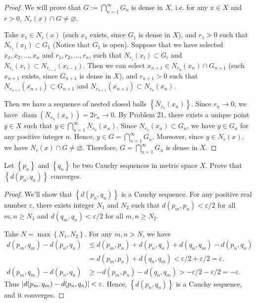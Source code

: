 \documentclass{article}
\begin{document}
\begin{proof}
	We will prove that \( G:=\bigcap_{n=1}^{\infty} G_n \) is dense in \( X \), i.e. for any \( x\in X \) and \( r>0 \), \( N_r(x)\cap G\neq\varnothing \). \par
	Take \( x_1\in N_r(x) \) (such \( x_1 \) exists, since \( G_1 \) is dense in \( X \)), and \( r_1>0 \) such that \( N_{r_1}(x_1)\subset G_1 \) (Notice that \( G_1 \) is open). 
	Suppose that we have selected \( x_1,x_2,\dots,x_{n} \) and \( r_1,r_2,\dots,r_{n} \), such that \( N_{r_i}(x_i)\subset G_i \) and \( N_{r_i}(x_i)\subset N_{r_{i-1}}(x_{i-1}) \). Then we can select \( x_{n+1}\in N_{r_n}(x_n)\cap G_{n+1} \) (such \( x_{n+1} \) exists, since \( G_{n+1} \) is dense in \( X \)), and \( r_{n+1}>0 \) such that \( N_{r_{n+1}}(x_{n+1})\subset G_{n+1} \) and \( N_{r_{n+1}}(x_{n+1})\subset N_{r_n}(x_n) \). \par
	Then we have a sequence of nested closed balls \( \left\{\overline{N}_{r_n}(x_n)\right\} \). Since \( r_n\to 0 \), we have \( \operatorname{diam}(\overline{N}_{r_n}(x_n))=2r_n\to 0 \). By Problem 21, there exists a unique point \( y\in X \) such that \( y\in \bigcap_{n=1}^{\infty} \overline{N}_{r_n}(x_n) \). Since \( N_{r_n}(x_n)\subset G_n \), we have \( y\in G_n \) for any positive integer \( n \). Hence, \( y\in G=\bigcap_{n=1}^{\infty} G_n \). Moreover, since \( y\in N_r(x) \), we have \( N_r(x)\cap G\neq\varnothing \). Therefore, \( G=\bigcap_{n=1}^{\infty} G_n \) is dense in \( X \).
\end{proof}

\begin{problem}[3-23]
	Let \( \left\{p_n\right\} \) and \( \left\{q_n\right\} \) be two Cauchy sequences in metric space \( X \). Prove that \( \left\{d(p_n,q_n)\right\} \) converges.
\end{problem}

\begin{proof}
	We'll show that \( \left\{d(p_n,q_n)\right\} \) is a Cauchy sequence. For any positive real number \( \varepsilon \), there exists integer \( N_1 \) and \( N_2 \) such that \( d(p_m,p_n)<\varepsilon/2 \) for all \( m,n\geq N_1 \) and \( d(q_m,q_n)<\varepsilon/2 \) for all \( m,n\geq N_2 \).\par
	Take \( N=\max \left\{N_1,N_2\right\} \). For any \( m,n>N \), we have
	\begin{align*}
		d(p_m,q_m)-d(p_n,q_n) &\le d(p_m,p_n)+d(p_n,q_n)+d(q_n,q_m)-d(p_n,q_n)\\
		&=d(p_m,p_n)+d(q_n,q_m)<\varepsilon/2+\varepsilon/2=\varepsilon.\\
		d(p_m,q_m)-d(p_n,q_n) &\ge -d(p_m,p_n)-d(q_n,q_m)>-\varepsilon/2-\varepsilon/2=-\varepsilon.
	\end{align*}
	Thus \( \left|d(p_m,q_m)-d(p_n,q_n)\right|<\varepsilon \). Hence, \( \left\{d(p_n,q_n)\right\} \) is a Cauchy sequence, and it converges.
\end{proof}
\end{document}
